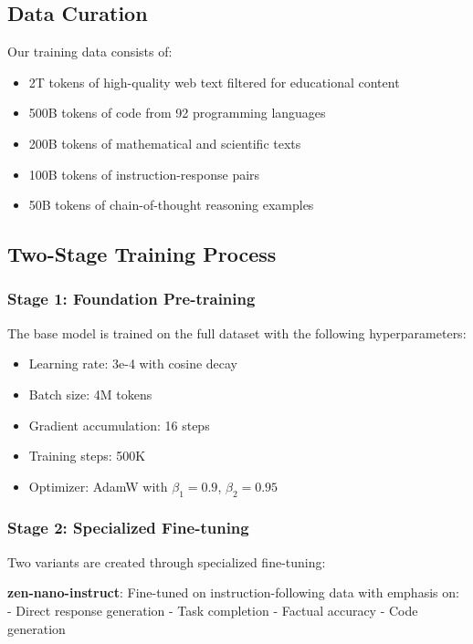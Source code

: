 \documentclass[11pt,a4paper]{article}
\begin{document}
\subsection{Data Curation}

Our training data consists of:
\begin{itemize}
    \item 2T tokens of high-quality web text filtered for educational content
    \item 500B tokens of code from 92 programming languages
    \item 200B tokens of mathematical and scientific texts
    \item 100B tokens of instruction-response pairs
    \item 50B tokens of chain-of-thought reasoning examples
\end{itemize}

\subsection{Two-Stage Training Process}

\subsubsection{Stage 1: Foundation Pre-training}

The base model is trained on the full dataset with the following hyperparameters:
\begin{itemize}
    \item Learning rate: 3e-4 with cosine decay
    \item Batch size: 4M tokens
    \item Gradient accumulation: 16 steps
    \item Training steps: 500K
    \item Optimizer: AdamW with $\beta_1=0.9$, $\beta_2=0.95$
\end{itemize}

\subsubsection{Stage 2: Specialized Fine-tuning}

Two variants are created through specialized fine-tuning:

\textbf{zen-nano-instruct}: Fine-tuned on instruction-following data with emphasis on:
- Direct response generation
- Task completion
- Factual accuracy
- Code generation
\end{document}
